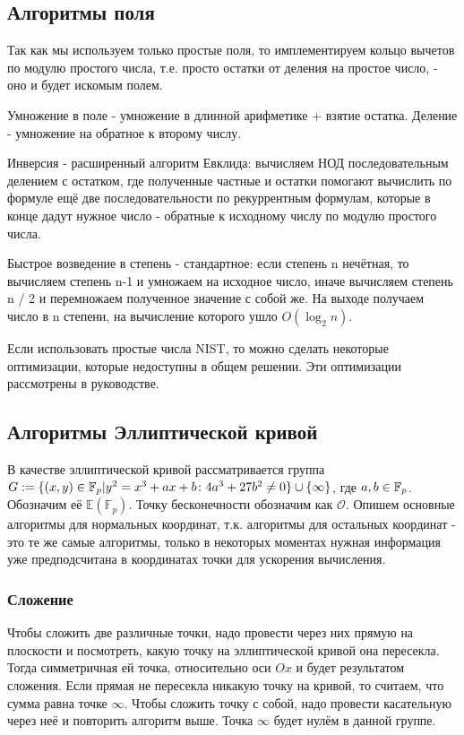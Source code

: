 \documentclass{article}
\begin{document}
  \subsection{Алгоритмы поля}
    Так как мы используем только простые поля, то имплементируем кольцо вычетов по модулю простого числа, т.е. просто остатки от деления на простое число, - оно и будет искомым полем.

    Умножение в поле - умножение в длинной арифметике + взятие остатка. Деление - умножение на обратное к второму числу. 

    Инверсия - расширенный алгоритм Евклида:
      вычисляем НОД последовательным делением с остатком, где полученные частные и остатки помогают вычислить по формуле ещё две последовательности по рекуррентным формулам, которые в конце дадут нужное число - обратные к исходному числу по модулю простого числа. 

    Быстрое возведение в степень - стандартное: если степень n нечётная, то вычисляем степень n-1 и умножаем на исходное число, иначе вычисляем степень n / 2 и перемножаем полученное значение с собой же. На выходе получаем число в n степени, на вычисление которого ушло $O(\log_2 n)$.

    Если использовать простые числа NIST, то можно сделать некоторые оптимизации, которые недоступны в общем решении. Эти оптимизации рассмотрены в руководстве.
  \subsection{Алгоритмы Эллиптической кривой}
    В качестве эллиптической кривой рассматривается группа $G:=\{(x,y)\in \mathbb{F}_p | y^2=x^3+ax+b\colon 4a^3+27b^2\neq 0\}\cup \{\infty\}$, где $a,b\in\mathbb{F}_p$. Обозначим её $\mathbb{E}(\mathbb{F}_p)$. Точку бесконечности обозначим как $\mathcal{O}$. Опишем основные алгоритмы для нормальных координат, т.к. алгоритмы для остальных координат - это те же самые алгоритмы, только в некоторых моментах нужная информация уже предподсчитана в координатах точки для ускорения вычисления.
    \subsubsection{Сложение}
    Чтобы сложить две различные точки, надо провести через них прямую на плоскости и посмотреть, какую точку на эллиптической кривой она пересекла. Тогда симметричная ей точка, относительно оси $Ox$ и будет результатом сложения. Если прямая не пересекла никакую точку на кривой, то считаем, что сумма равна точке $\infty$. Чтобы сложить точку с собой, надо провести касательную через неё и повторить алгоритм выше. Точка $\infty$ будет нулём в данной группе. 
\end{document}
